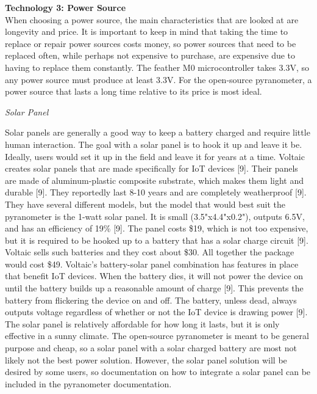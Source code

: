 \documentclass[10pt,draftclsnofoot,onecolumn,letterpaper]{article}
\begin{document}
    {\fontsize{10pt}{12.0pt} \textbf{Technology 3: Power Source}\\When choosing a power source, the main characteristics that are looked at are longevity and price. It is important to keep in mind that taking the time to replace or repair power sources costs money, so power sources that need to be replaced often, while perhaps not expensive to purchase, are expensive due to having to replace them constantly. The feather M0 microcontroller takes 3.3V, so any power source must produce at least 3.3V. For the open-source pyranometer, a power source that lasts a long time relative to its price is most ideal.\\\selectfont 
    \par}\par
    {\fontsize{10pt}{12.0pt}\textit{Solar Panel}\\\selectfont 
    \par}\par
    {\fontsize{10pt}{12.0pt} Solar panels are generally a good way to keep a battery charged and require little human interaction. The goal with a solar panel is to hook it up and leave it be. Ideally, users would set it up in the field and leave it for years at a time. Voltaic creates solar panels that are made specifically for IoT devices [9]. Their panels are made of aluminum-plastic composite substrate, which makes them light and durable [9]. They reportedly last 8-10 years and are completely weatherproof [9]. They have several different models, but the model that would best suit the pyranometer is the 1-watt solar panel. It is small (3.5"x4.4"x0.2"), outputs 6.5V, and has an efficiency of 19\% [9]. The panel costs \$19, which is not too expensive, but it is required to be hooked up to a battery that has a solar charge circuit [9]. Voltaic sells such batteries and they cost about \$30. All together the package would cost \$49. Voltaic's battery-solar panel combination has features in place that benefit IoT devices. When the battery dies, it will not power the device on until the battery builds up a reasonable amount of charge [9]. This prevents the battery from flickering the device on and off. The battery, unless dead, always outputs voltage regardless of whether or not the IoT device is drawing power [9]. The solar panel is relatively affordable for how long it lasts, but it is only effective in a sunny climate. The open-source pyranometer is meant to be general purpose and cheap, so a solar panel with a solar charged battery are most not likely not the best power solution. However, the solar panel solution will be desired by some users, so documentation on how to integrate a solar panel can be included in the pyranometer documentation. \\\selectfont 
    \par}\par
\end{document}
